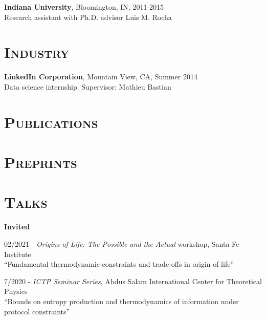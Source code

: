 \documentclass[margin,line,centered]{res}
\begin{document}
\begin{resume}
\textbf{Indiana University}, Bloomington, IN, 2011-2015\\
Research assistant with Ph.D. advisor Luis M. Rocha 

\section{\textsc{Industry}}

\textbf{LinkedIn Corporation}, Mountain View, CA, Summer 2014\\
Data science internship. Supervisor: Mathieu Bastian

\section{\textsc{Publications}}


\section{\textsc{Preprints}}


\section{\textsc{Talks}}

\textbf{Invited}

02/2021 - \emph{Origins of Life: The Possible and the Actual} workshop, Santa Fe Institute\\
``Fundamental thermodynamic constraints and trade-offs in origin of life'' %


7/2020 - \emph{ICTP Seminar Series}, Abdus Salam International Center for Theoretical Physics\\
``Bounds on entropy production and thermodynamics of information under protocol constraints'' %



\end{resume}
\end{document}
